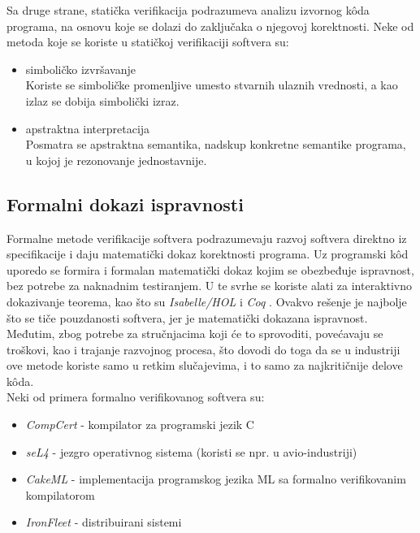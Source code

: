 \documentclass[a4paper]{article}
\begin{document}
Sa druge strane, statička verifikacija podrazumeva analizu izvornog k\^{o}da programa, na osnovu koje se dolazi do zaključaka o njegovoj korektnosti.
Neke od metoda koje se koriste u statičkoj verifikaciji softvera su:
\begin{itemize}
\item simboličko izvršavanje \cite{symbolic_execution}\\
Koriste se simboličke promenljive umesto stvarnih ulaznih vrednosti, a kao izlaz se dobija simbolički izraz.
\item apstraktna interpretacija \cite{abstract_interpretation}\\
Posmatra se apstraktna semantika, nadskup konkretne semantike programa, u kojoj je rezonovanje jednostavnije.

\end{itemize}


\subsection{Formalni dokazi ispravnosti}
\label{subsec:formalni_dokazi}
Formalne metode verifikacije softvera podrazumevaju razvoj softvera direktno iz specifikacije i daju matematički dokaz korektnosti programa.
Uz programski k\^{o}d uporedo se formira i formalan matematički dokaz kojim se obezbeđuje ispravnost, bez potrebe za naknadnim testiranjem.
U te svrhe se koriste alati za interaktivno dokazivanje teorema, kao što su \emph{Isabelle/HOL} \cite{isabelle} i \emph{Coq} \cite{coq}.
Ovakvo rešenje je najbolje što se tiče pouzdanosti softvera, jer je matematički dokazana ispravnost.
Međutim, zbog potrebe za stručnjacima koji će to sprovoditi, povećavaju se troškovi, kao i trajanje razvojnog procesa, što dovodi do toga da se u industriji ove metode koriste samo u retkim slučajevima, i to samo za najkritičnije delove k\^{o}da.\\
Neki od primera formalno verifikovanog softvera su:
\begin{itemize}
\item \emph{CompCert} - kompilator za programski jezik C \cite{compcert}
\item \emph{seL4} - jezgro operativnog sistema (koristi se npr. u avio-industriji) \cite{sel4}
\item \emph{CakeML} - implementacija programskog jezika ML sa formalno verifikovanim kompilatorom \cite{cakeml}
\item \emph{IronFleet} - distribuirani sistemi \cite{ironfleet}
\end{itemize}
\end{document}
